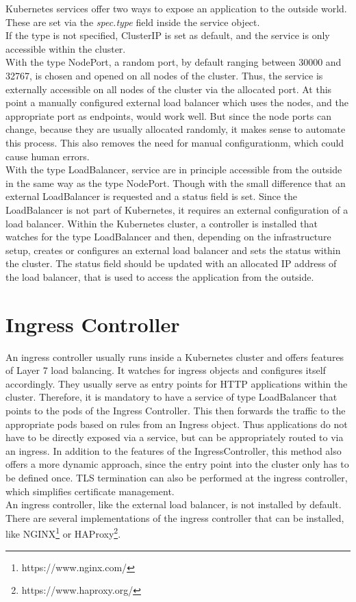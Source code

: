 Kubernetes services offer two ways to expose an application to the outside world.
These are set via the \textit{spec.type} field inside the service object.
\\
If the type is not specified, ClusterIP is set as default, and the service is only accessible within the cluster.
\\
With the type NodePort, a random port, by default ranging between 30000 and 32767, is chosen and opened on all nodes of the cluster.
Thus, the service is externally accessible on all nodes of the cluster via the allocated port.
At this point a manually configured external load balancer which uses the nodes, and the appropriate port as endpoints, would work well.
But since the node ports can change, because they are usually allocated randomly, it makes sense to automate this process. This also removes the need for manual configurationm, which could cause human errors.
\\
With the type LoadBalancer, service are in principle accessible from the outside in the same way as the type NodePort. Though with the small difference that an external LoadBalancer is requested and a status field is set.
Since the LoadBalancer is not part of Kubernetes, it requires an external configuration of a load balancer.
Within the Kubernetes cluster, a controller is installed that watches for the type LoadBalancer and then, depending on the infrastructure setup, creates or configures an external load balancer and sets the status within the cluster.
The status field should be updated with an allocated IP address of the load balancer, that is used to access the application from the outside.~\cite{KUBERNETES-SERVICE}

\section{Ingress Controller}\label{sec:IngressController}

An ingress controller usually runs inside a Kubernetes cluster and offers features of Layer 7 load balancing.
It watches for ingress objects and configures itself accordingly.
They usually serve as entry points for HTTP applications within the cluster.
Therefore, it is mandatory to have a service of type LoadBalancer that points to the pods of the Ingress Controller.
This then forwards the traffic to the appropriate pods based on rules from an Ingress object.
Thus applications do not have to be directly exposed via a service, but can be appropriately routed to via an ingress.
In addition to the features of the IngressController, this method also offers a more dynamic approach, since the entry point into the cluster only has to be defined once.
TLS termination can also be performed at the ingress controller, which simplifies certificate management.~\cite{KUBERNETES-INGRESS}
\\
An ingress controller, like the external load balancer, is not installed by default.
There are several implementations of the ingress controller that can be installed, like NGINX\footnote{https://www.nginx.com/} or HAProxy\footnote{https://www.haproxy.org/}.~\cite{KUBERNETES-INGRESS-CONTROLLER}

